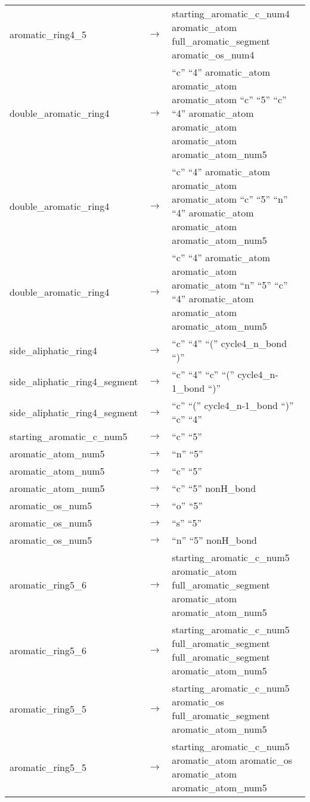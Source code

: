 \documentclass[../Document.tex]{subfiles}
\begin{document}
\begin{longtable}{m{} p{} p{}}
    aromatic\_ring4\_5 & $\rightarrow$ & starting\_aromatic\_c\_num4 aromatic\_atom full\_aromatic\_segment aromatic\_os\_num4 \\
    double\_aromatic\_ring4 & $\rightarrow$ & ``c'' ``4'' aromatic\_atom aromatic\_atom aromatic\_atom ``c'' ``5'' ``c'' ``4'' aromatic\_atom aromatic\_atom aromatic\_atom aromatic\_atom\_num5 \\
    double\_aromatic\_ring4 & $\rightarrow$ & ``c'' ``4'' aromatic\_atom aromatic\_atom aromatic\_atom ``c'' ``5'' ``n'' ``4'' aromatic\_atom aromatic\_atom aromatic\_atom\_num5 \\
    double\_aromatic\_ring4 & $\rightarrow$ & ``c'' ``4'' aromatic\_atom aromatic\_atom aromatic\_atom ``n'' ``5'' ``c'' ``4'' aromatic\_atom aromatic\_atom aromatic\_atom\_num5 \\
    side\_aliphatic\_ring4 & $\rightarrow$ & ``c'' ``4'' ``('' cycle4\_n\_bond ``)'' \\
    side\_aliphatic\_ring4\_segment & $\rightarrow$ & ``c'' ``4'' ``c'' ``('' cycle4\_n-1\_bond ``)'' \\
    side\_aliphatic\_ring4\_segment & $\rightarrow$ & ``c'' ``('' cycle4\_n-1\_bond ``)'' ``c'' ``4'' \\
    starting\_aromatic\_c\_num5 & $\rightarrow$ & ``c'' ``5'' \\
    aromatic\_atom\_num5 & $\rightarrow$ & ``n'' ``5'' \\
    aromatic\_atom\_num5 & $\rightarrow$ & ``c'' ``5'' \\
    aromatic\_atom\_num5 & $\rightarrow$ & ``c'' ``5'' nonH\_bond \\
    aromatic\_os\_num5 & $\rightarrow$ & ``o'' ``5'' \\
    aromatic\_os\_num5 & $\rightarrow$ & ``s'' ``5'' \\
    aromatic\_os\_num5 & $\rightarrow$ & ``n'' ``5'' nonH\_bond \\
    aromatic\_ring5\_6 & $\rightarrow$ & starting\_aromatic\_c\_num5 aromatic\_atom full\_aromatic\_segment aromatic\_atom aromatic\_atom\_num5 \\
    aromatic\_ring5\_6 & $\rightarrow$ & starting\_aromatic\_c\_num5 full\_aromatic\_segment full\_aromatic\_segment aromatic\_atom\_num5 \\
    aromatic\_ring5\_5 & $\rightarrow$ & starting\_aromatic\_c\_num5 aromatic\_os full\_aromatic\_segment aromatic\_atom\_num5 \\
    aromatic\_ring5\_5 & $\rightarrow$ & starting\_aromatic\_c\_num5 aromatic\_atom aromatic\_os aromatic\_atom aromatic\_atom\_num5 \\

\end{longtable}
\end{document}
